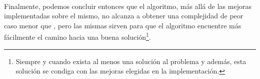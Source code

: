 \paragraph{}
Finalmente, podemos concluir entonces que el algoritmo, más allá de las mejoras implementadas sobre el mismo, no alcanza a obtener una complejidad de peor caso menor que , pero las mismas sirven para que el algoritmo encuentre más fácilmente el camino hacia una buena solución\footnote{Siempre y cuando exista al menos una solución al problema y además, esta solución se condiga con las mejoras elegidas en la implementación.}.

